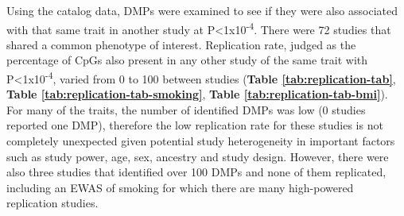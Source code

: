 \documentclass[11pt,oneside]{bristolthesis}
\begin{document}
Using the catalog data, DMPs were examined to see if they were also associated with that same trait in another study at P\textless1x10\textsuperscript{-4}. There were 72 studies that shared a common phenotype of interest. Replication rate, judged as the percentage of CpGs also present in any other study of the same trait with P\textless1x10\textsuperscript{-4}, varied from 0 to 100 between studies (\textbf{Table \ref{tab:replication-tab}}, \textbf{Table \ref{tab:replication-tab-smoking}}, \textbf{Table \ref{tab:replication-tab-bmi}}). For many of the traits, the number of identified DMPs was low (0 studies reported one DMP), therefore the low replication rate for these studies is not completely unexpected given potential study heterogeneity in important factors such as study power, age, sex, ancestry and study design. However, there were also three studies that identified over 100 DMPs and none of them replicated, including an EWAS of smoking for which there are many high-powered replication studies. \linebreak
\end{document}

